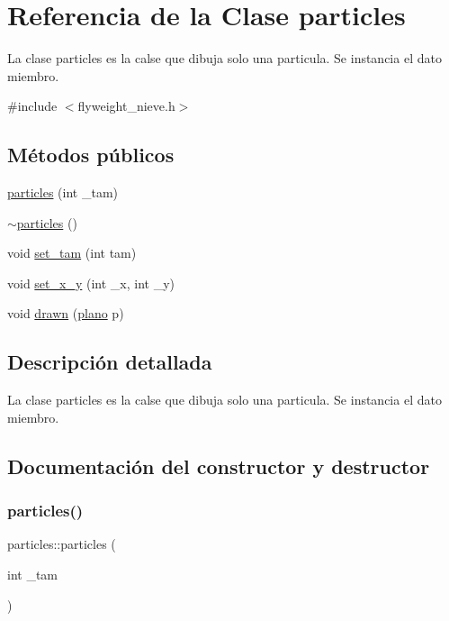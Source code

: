 \hypertarget{classparticles}{}\section{Referencia de la Clase particles}
\label{classparticles}


La clase particles es la calse que dibuja solo una particula.  Se instancia el dato miembro.  




{\ttfamily \#include $<$flyweight\+\_\+nieve.\+h$>$}

\subsection*{Métodos públicos}
\begin{DoxyCompactItemize}
\item 
\hyperlink{classparticles_a3c777a01910495af29eba8f6716ff281}{particles} (int \+\_\+tam)
\item 
\hyperlink{classparticles_a595906f264178672e1f8fb3a047e056d}{$\sim$particles} ()
\item 
void \hyperlink{classparticles_a4ef23182e87e18e3cec15280478210d8}{set\+\_\+tam} (int tam)
\item 
void \hyperlink{classparticles_aed9719fe5f8de507f97c154b220307c6}{set\+\_\+x\+\_\+y} (int \+\_\+x, int \+\_\+y)
\item 
void \hyperlink{classparticles_a854301db81fec822416fa2a54a1b09d7}{drawn} (\hyperlink{classplano}{plano} p)
\end{DoxyCompactItemize}


\subsection{Descripción detallada}
La clase particles es la calse que dibuja solo una particula.  Se instancia el dato miembro. 

\subsection{Documentación del constructor y destructor}
\mbox{\label{classparticles_a3c777a01910495af29eba8f6716ff281}} 
\subsubsection{\texorpdfstring{particles()}{particles()}}
{\footnotesize\ttfamily particles\+::particles (\begin{DoxyParamCaption}\item[{int}]{\+\_\+tam }\end{DoxyParamCaption})}

